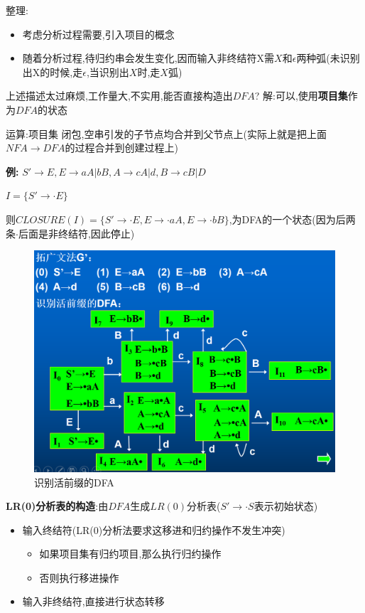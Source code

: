 \documentclass[UTF8,a4paper]{ctexart}
\newcommand{\spaceline}{\vspace{\baselineskip}}
\begin{document}
 整理:
 \begin{itemize}
  \item 考虑分析过程需要,引入项目的概念
  \item 随着分析过程,待归约串会发生变化,因而输入非终结符X需$X$和$\epsilon$两种弧(未识别出X的时候,走$
         \epsilon$,当识别出$X$时,走$X$弧)
 \end{itemize}

 \spaceline
 上述描述太过麻烦,工作量大,不实用,能否直接构造出$DFA$?
 解:可以,使用\textbf{项目集}作为$DFA$的状态

 运算:项目集 闭包,空串引发的子节点均合并到父节点上(实际上就是把上面$NFA\to DFA$的过程合并到创建过程上)

 \textbf{例:}
$S'\to E , E\to aA|bB,A\to cA | d , B\to cB | D$

$I = \{S' \to \cdot E\}$

 则$CLOSURE(I) = \{S'\to \cdot E , E\to \cdot aA , E\to \cdot bB\}$,为DFA的一个状态(因为后两条$\cdot$后面是非终结符,因此停止)

 \begin{figure}[H]
  \centering
  \includegraphics[scale = 0.3]{assets/CompilerConstructionPrinciples_30568.png}
  \caption{识别活前缀的DFA}
 \end{figure}

 \spaceline
 \textbf{LR(0)分析表的构造}:由$DFA$生成$LR(0)$分析表($S'\to \cdot S$表示初始状态)
 \begin{itemize}
  \item 输入终结符(LR(0)分析法要求这移进和归约操作不发生冲突)
        \begin{itemize}
         \item 如果项目集有归约项目,那么执行归约操作
         \item 否则执行移进操作
        \end{itemize}
  \item 输入非终结符,直接进行状态转移
 \end{itemize}
\end{document}

